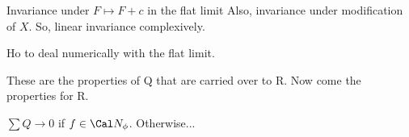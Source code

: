 \preskip
\property Invariance under $F\mapsto F+c$ in the flat limit
\postskip
Also, invariance under modification of $X$.  So, linear invariance complexively.

Ho to deal numerically with the flat limit.


These are the properties of Q that are carried over to R.  Now come the properties for R.

\preskip
\property
$\sum Q \to 0$ if $f\in \Cal N_\phi$.  Otherwise...
\postskip
